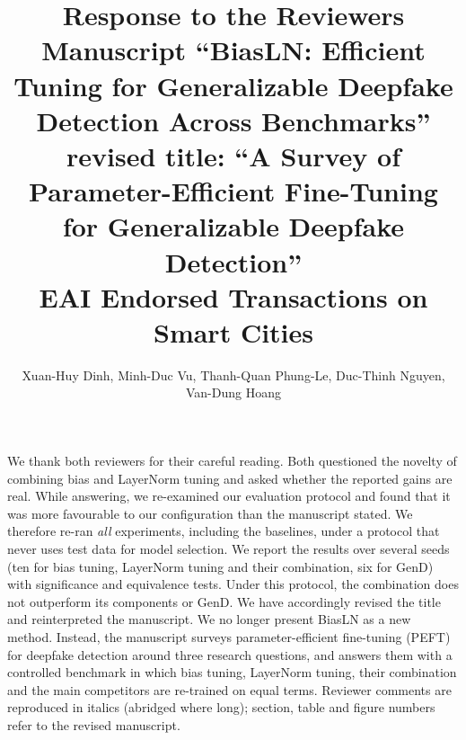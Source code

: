 \documentclass[11pt]{article}
\title{Response to the Reviewers\\[2pt]\normalsize Manuscript ``BiasLN: Efficient Tuning for Generalizable Deepfake Detection Across Benchmarks''\\ revised title: ``A Survey of Parameter-Efficient Fine-Tuning for Generalizable Deepfake Detection''\\EAI Endorsed Transactions on Smart Cities}
\author{Xuan-Huy Dinh, Minh-Duc Vu, Thanh-Quan Phung-Le, Duc-Thinh Nguyen, Van-Dung Hoang}
\date{}
\begin{document}
\maketitle

We thank both reviewers for their careful reading. Both questioned the novelty of combining bias and LayerNorm tuning and asked whether the reported gains are real. While answering, we re-examined our evaluation protocol and found that it was more favourable to our configuration than the manuscript stated. We therefore re-ran \emph{all} experiments, including the baselines, under a protocol that never uses test data for model selection. We report the results over several seeds (ten for bias tuning, LayerNorm tuning and their combination, six for GenD) with significance and equivalence tests. Under this protocol, the combination does not outperform its components or GenD. We have accordingly revised the title and reinterpreted the manuscript. We no longer present BiasLN as a new method. Instead, the manuscript surveys parameter-efficient fine-tuning (PEFT) for deepfake detection around three research questions, and answers them with a controlled benchmark in which bias tuning, LayerNorm tuning, their combination and the main competitors are re-trained on equal terms. Reviewer comments are reproduced in italics (abridged where long); section, table and figure numbers refer to the revised manuscript.
\end{document}
